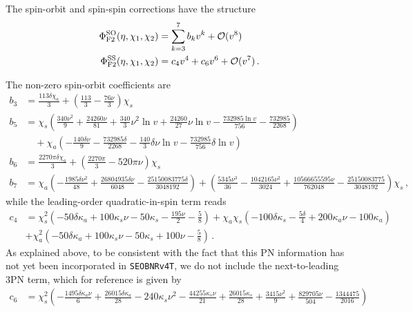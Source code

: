 \documentclass[prd,aps,letter,twocolumn,floatfix,notitlepage,nofootinbib]{revtex4-1}
\begin{document}
The spin-orbit and spin-spin corrections have the structure
\begin{align}
	\Phi_{\rm F2}^{\rm SO}(\eta, \chi_{1}, \chi_{2}) &= \sum_{k=3}^{7} b_{k} v^{k} + \mathcal{O}(v^{8})\nonumber\\
	\Phi_{\rm F2}^{\rm SS}(\eta, \chi_{1}, \chi_{2}) &= c_{4} v^{4} + c_{6} v^{6} + \mathcal{O}(v^{7}) \,.
\end{align}
\begin{widetext}
The non-zero spin-orbit coefficients are
\begin{align}
	b_{3} &= \frac{113 \delta   \chi_a }{3}+\left(\frac{113}{3}-\frac{76 \nu }{3}\right)  \chi_s \nonumber\\
	b_{5} &=  \chi_s  \left(\frac{340 \nu ^2}{9}+\frac{24260 \nu }{81}+\frac{340}{3} \nu ^2  \ln v +\frac{24260}{27} \nu   \ln v -\frac{732985  \ln v }{756}-\frac{732985}{2268}\right) \nonumber\\
	& \quad + \chi_a  \left(-\frac{140 \delta  \nu }{9}-\frac{732985 \delta }{2268}-\frac{140}{3} \delta  \nu   \ln v -\frac{732985}{756} \delta   \ln v \right)  \nonumber\\
	b_{6} &= \frac{2270 \pi  \delta   \chi_a }{3}+\left(\frac{2270 \pi }{3}-520 \pi  \nu \right)  \chi_s \nonumber\\
	b_{7} &=  \chi_a  \left(-\frac{1985 \delta  \nu ^2}{48}+\frac{26804935 \delta  \nu }{6048}-\frac{25150083775 \delta }{3048192}\right)+\left(\frac{5345 \nu ^3}{36}-\frac{1042165 \nu ^2}{3024}+\frac{10566655595 \nu }{762048}-\frac{25150083775}{3048192}\right)  \chi_s \,,
\end{align}
while the leading-order quadratic-in-spin term reads
\begin{align}
	c_{4} &= \chi_s ^2 \left(-50 \delta   \kappa_a +100  \kappa_s  \nu -50  \kappa_s -\frac{195 \nu }{2}-\frac{5}{8}\right) + \chi_a   \chi_s  \left(-100 \delta   \kappa_s -\frac{5 \delta }{4}+200  \kappa_a  \nu -100  \kappa_a \right) \nonumber\\
	& + \chi_a ^2 \left(-50 \delta   \kappa_a +100  \kappa_s  \nu -50  \kappa_s +100 \nu -\frac{5}{8}\right) \,.
\end{align}
As explained above, to be consistent with the fact that this PN information has not yet been incorporated in \texttt{SEOBNRv4T}, we do not include the next-to-leading 3PN term, which for reference is given by
\begin{align}
	c_{6} &=  \chi_s ^2 \left(-\frac{1495 \delta   \kappa_a  \nu }{6}+\frac{26015 \delta   \kappa_a }{28}-240  \kappa_s  \nu ^2-\frac{44255  \kappa_s  \nu }{21}+\frac{26015  \kappa_s }{28}+\frac{3415 \nu ^2}{9}+\frac{829705 \nu }{504}-\frac{1344475}{2016}\right) \nonumber\\

\end{align}
\end{widetext}
\end{document}

